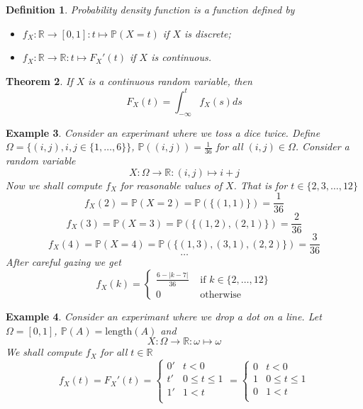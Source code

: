 \documentclass[12pt]{article}
\newtheorem{theorem}{Theorem}[subsection]
\newtheorem{definition}[theorem]{Definition}
\newtheorem{example}[theorem]{Example}
\begin{document}
\begin{definition} Probability density function is a function defined by
    \begin{itemize}
        \item $f_X:\mathbb{R}\to [0,1]: t\mapsto \mathbb{P}(X=t)$ if $X$ is
              discrete;
        \item $f_X:\mathbb{R}\to\mathbb{R}: t\mapsto  F_X'(t) $ if $X$ is
              continuous.
    \end{itemize}
\end{definition}

\begin{theorem} If $X$ is a continuous random variable, then
    $$
        F_X(t)=\int_{-\infty}^t f_X(s)ds
    $$
\end{theorem}

\begin{example} Consider an experimant where we toss a dice twice. Define
    $\Omega=\{(i,j), i,j\in \{1,\ldots,6\} \}$,
    $\mathbb{P}((i,j))=\frac{1}{36}$ for all
    $(i,j)\in \Omega$. Consider a random variable
    $$
        X:\Omega\to\mathbb{R}:(i,j)\mapsto i+j
    $$
    Now we shall compute $f_X$ for reasonable values of $X$. That is for
    $t\in \{2,3,\ldots,12\}$
    $$
        f_X(2)=\mathbb{P}(X=2)=\mathbb{P}(\{(1,1)\})=\frac{1}{36}
    $$
    $$
        f_X(3)=\mathbb{P}(X=3)=\mathbb{P}(\{(1,2),(2,1)\})=\frac{2}{36}
    $$
    $$
        f_X(4)=\mathbb{P}(X=4)=\mathbb{P}(\{(1,3),(3,1),(2,2)\})=\frac{3}{36}
    $$
    $$
        \ldots
    $$
    After careful gazing we get
    $$
        f_X(k)=
        \begin{cases}
            \frac{6-|k-7|}{36} & \mbox{ if } k\in \{2,\ldots,12\} \\
            0                  & \mbox{ otherwise }
        \end{cases}
    $$
\end{example}

\begin{example} Consider an experimant where we drop a dot on a line. 
    Let $\Omega=[0,1]$,
    $\mathbb{P}(A)=\mbox{length}(A)$ and
    $$
        X:\Omega\to\mathbb{R}:\omega\mapsto \omega
    $$
    We shall compute $f_X$ for all $t\in\mathbb{R}$
    $$
        f_X(t)=F_X'(t)
        =\begin{cases}
            0' & t < 0          \\
            t' & 0\leq t \leq 1 \\
            1' & 1 < t          \\
        \end{cases}
        =\begin{cases}
            0 & t < 0          \\
            1 & 0\leq t \leq 1 \\
            0 & 1 < t          \\
        \end{cases}
    $$
\end{example}
\end{document}
